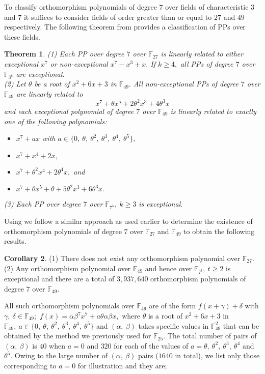 \documentclass[12pt,a4wide, reqno]{amsart}
\newtheorem{theorem}{Theorem}[section]
\theoremstyle{definition}
\newtheorem{corollary}[theorem]{Corollary}
\theoremstyle{remark}
\numberwithin{equation}{section}
\begin{document}
To classify orthomorphism polynomials of degree $7$ over fields of characteristic $3$ and $7$ it suffices to consider fields of order greater than or equal to $27$ and $49$ respectively. The following theorem from \cite{xfan} provides a classification of PPs over these fields.
\begin{theorem}\cite[Theorem~14,  Theorem~16]{xfan} \label{thmm}(1) Each PP over degree $7$ over $\mathbb{F}_{27}$ is linearly related to either exceptional $x^7$ or non-exceptional $x^7-x^3+x.$ If $k\geq 4,$ all PPs of degree $7$ over $\mathbb{F}_{3^k}$ are exceptional.\\
(2) Let $\theta$ be a root of $x^2+6x+3$ in $\mathbb{F}_{49}.$ All non-exceptional PPs of degree $7$  over $\mathbb{F}_{49}$ are linearly related to $$x^7+\theta x^5+2\theta^2x^3+4\theta^3x$$ and each exceptional polynomial of degree $7$ over $\mathbb{F}_{49}$ is linearly related to exactly one of the following polynomials:
\begin{itemize}
    \item 
    $x^7+ax$ with $a\in\{0,~\theta,~\theta^2,~\theta^3,~\theta^4,~\theta^5\},$
    \item 
    $x^7+x^4+2x,$
    \item 
    $x^7+\theta^2x^4+2\theta^4x,$ and
    \item 
    $x^7+\theta x^5+\theta+5\theta^2x^3+6\theta^3x.$
\end{itemize}
(3) Each PP over degree $7$ over $\mathbb{F}_{7^k},~k\geq 3$ is exceptional.
\end{theorem}
Using  we follow a similar approach as used earlier to determine the existence of orthomorphism polynomials of degree $7$ over $\mathbb{F}_{27}$ and $\mathbb{F}_{49}$ to obtain the following results.
\begin{corollary}\label{cor3.5}
    (1) There does not exist any orthomorphism polynomial over $\mathbb{F}_{27}.$\\
    (2) Any orthomorphism polynomial over $\mathbb{F}_{49}$ and hence over $\mathbb{F}_{7^t},~t\geq 2$ is exceptional and there are a total of $3,937,640$ orthomorphism polynomials of degree $7$ over $\mathbb{F}_{49}.$
    \end{corollary}
    All such orthomorphism polynomials over $\mathbb{F}_{49}$ are of the form $f(x+\gamma)+\delta$ with $\gamma,~\delta \in \mathbb{F}_{49}$;~$f(x)=\alpha\beta^7x^7+a\theta \alpha\beta x,$ where $\theta$ is a root of $x^2+6x+3$ in $\mathbb{F}_{49},~a\in\{0,~\theta,~\theta^2,~\theta^3,~\theta^4,~\theta^5\}$ and $(\alpha,~\beta)$ takes specific values in $\mathbb{F}_{49}^2$ that can be obtained by the method we previously used for $\mathbb{F}_{25}.$ The total number of pairs of $(\alpha,~\beta)$ is $40$ when $a=0$ and $320$ for each of the values of $a=\theta,~\theta^2,~\theta^3,~\theta^4$ and $\theta^5.$ Owing to the large number of $(\alpha,~\beta)$ pairs ($1640$ in total), we list only those corresponding to $a=0$ for illustration and they are;\\
\end{document}
